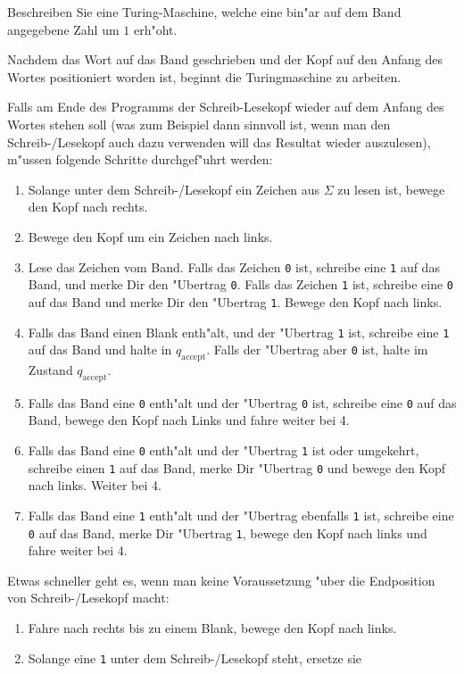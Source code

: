 Beschreiben Sie eine Turing-Maschine, welche eine bin"ar auf dem
Band angegebene Zahl um $1$ erh"oht.

\begin{loesung}
Nachdem das Wort auf das Band geschrieben und der Kopf auf den
Anfang des Wortes positioniert worden ist, beginnt die Turingmaschine
zu arbeiten. 

Falls am Ende des Programms der Schreib-Lesekopf wieder auf dem
Anfang des Wortes stehen soll (was zum Beispiel dann sinnvoll ist,
wenn man den Schreib-/Lesekopf auch dazu verwenden will das
Resultat wieder auszulesen),  m"ussen folgende
Schritte durchgef"uhrt werden:
\begin{enumerate}
\item Solange unter dem Schreib-/Lesekopf ein Zeichen aus $\Sigma$
zu lesen ist, bewege den Kopf nach rechts.
\item Bewege den Kopf um ein Zeichen nach links.
\item Lese das Zeichen vom Band. Falls das Zeichen {\tt 0} ist,
schreibe eine {\tt 1} auf das Band, und merke Dir den "Ubertrag {\tt 0}.
Falls das Zeichen {\tt 1} ist, schreibe eine {\tt 0} auf das Band und
merke Dir den "Ubertrag {\tt 1}.
Bewege den Kopf nach links.
\item Falls das Band einen Blank enth"alt, und der "Ubertrag {\tt 1}
ist, schreibe eine {\tt 1} auf das Band und halte in $q_{\text{accept}}$.
Falls der "Ubertrag aber {\tt 0} ist, halte im Zustand $q_{\text{accept}}$.
\item Falls das Band eine {\tt 0} enth"alt und der "Ubertrag {\tt 0} ist,
schreibe eine {\tt 0} auf das Band, bewege den Kopf nach Links und fahre
weiter bei 4.
\item Falls das Band eine {\tt 0} enth"alt und der "Ubertrag {\tt 1}
ist oder umgekehrt, schreibe einen {\tt 1} auf das Band, merke Dir
"Ubertrag {\tt 0} und bewege den Kopf nach links. Weiter bei 4.
\item Falls das Band eine {\tt 1} enth"alt und der "Ubertrag ebenfalls
{\tt 1} ist, schreibe eine {\tt 0} auf das Band, merke Dir "Ubertrag {\tt 1},
bewege den Kopf nach links und fahre weiter bei 4.
\end{enumerate}
Etwas schneller geht es, wenn man keine Voraussetzung "uber die
Endposition von Schreib-/Lesekopf macht:
\begin{enumerate}
\item Fahre nach rechts bis zu einem Blank, bewege den Kopf nach links.
\item Solange eine {\tt 1} unter dem Schreib-/Lesekopf steht, ersetze sie

\end{enumerate}
\end{loesung}

